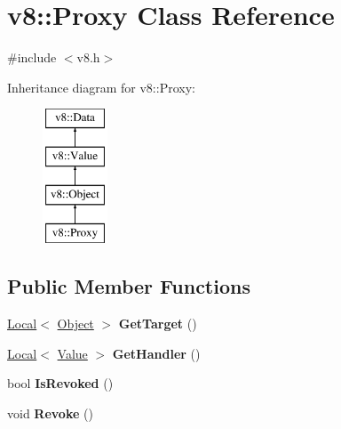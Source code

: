 \hypertarget{classv8_1_1Proxy}{}\section{v8\+:\+:Proxy Class Reference}
\label{classv8_1_1Proxy}


{\ttfamily \#include $<$v8.\+h$>$}

Inheritance diagram for v8\+:\+:Proxy\+:\begin{figure}[H]
\begin{center}
\leavevmode
\includegraphics[height=4.000000cm]{classv8_1_1Proxy}
\end{center}
\end{figure}
\subsection*{Public Member Functions}
\begin{DoxyCompactItemize}
\item 
\hyperlink{classv8_1_1Local}{Local}$<$ \hyperlink{classv8_1_1Object}{Object} $>$ {\bfseries Get\+Target} ()\hypertarget{classv8_1_1Proxy_adfb658a509cc0ff5361e22cff6a545d3}{}\label{classv8_1_1Proxy_adfb658a509cc0ff5361e22cff6a545d3}

\item 
\hyperlink{classv8_1_1Local}{Local}$<$ \hyperlink{classv8_1_1Value}{Value} $>$ {\bfseries Get\+Handler} ()\hypertarget{classv8_1_1Proxy_a19abaf64953263b26f81191eec00e5f5}{}\label{classv8_1_1Proxy_a19abaf64953263b26f81191eec00e5f5}

\item 
bool {\bfseries Is\+Revoked} ()\hypertarget{classv8_1_1Proxy_ad6100ff322bd5b0297deea20237ff065}{}\label{classv8_1_1Proxy_ad6100ff322bd5b0297deea20237ff065}

\item 
void {\bfseries Revoke} ()\hypertarget{classv8_1_1Proxy_a24a05c4dc89a74406456df8c14adff7e}{}\label{classv8_1_1Proxy_a24a05c4dc89a74406456df8c14adff7e}

\end{DoxyCompactItemize}
